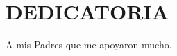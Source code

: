 \chapter*{DEDICATORIA}
    \begin{flushleft}
        \hspace{8cm}A mis Padres que me apoyaron mucho.
    \end{flushleft}
